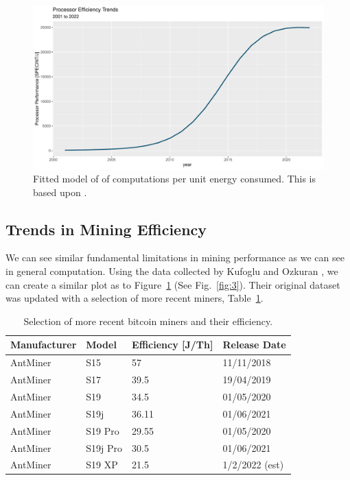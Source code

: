 \documentclass[runningheads]{llncs}
\begin{document}
\begin{figure}
    \includegraphics[width=\textwidth]{Processor Forecast.pdf}
    \caption{Fitted model of of computations per unit energy consumed. This is based upon \cite{rupp2020trends}.} \label{fig:2}
\end{figure}

\subsection{Trends in Mining Efficiency}

We can see similar fundamental limitations in mining performance as we can see in general computation.
Using the data collected by Kufoglu and Ozkuran \cite{kuf2019mining}, we can create a similar plot as to Figure~\ref{fig:2} (See Fig.~\ref{fig:3}).
Their original dataset was updated with a selection of more recent miners, Table~\ref{tbl:1}.

\begin{table}
    \caption{Selection of more recent bitcoin miners and their efficiency.}\label{tbl:1}
    \begin{tabular}{|l|l|l|l|}
        \hline
        Manufacturer & Model    & Efficiency [J/Th] & Release Date   \\
        \hline
        AntMiner     & S15      & 57                & 11/11/2018     \\
        AntMiner     & S17      & 39.5              & 19/04/2019     \\
        AntMiner     & S19      & 34.5              & 01/05/2020     \\
        AntMiner     & S19j     & 36.11             & 01/06/2021     \\
        AntMiner     & S19 Pro  & 29.55             & 01/05/2020     \\
        AntMiner     & S19j Pro & 30.5              & 01/06/2021     \\
        AntMiner     & S19 XP   & 21.5              & 1/2/2022 (est) \\
        \hline
    \end{tabular}
\end{table}
\end{document}
